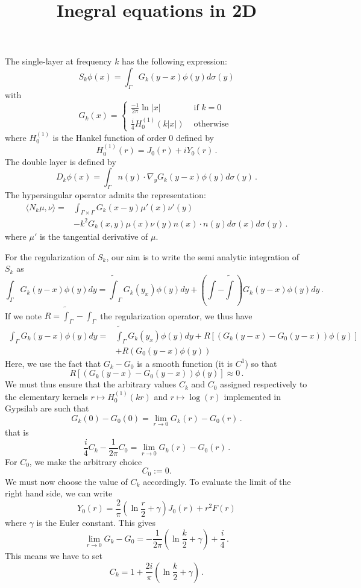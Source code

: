 \documentclass[utf8]{article}
\title{Inegral equations in 2D}
\begin{document}
\maketitle
The single-layer at frequency $k$ has the following expression:
\[S_k \phi(x) = \int_{\Gamma} G_k(y-x) \phi(y)d\sigma(y)\]
with	
\[G_k(x) = \begin{cases}
\frac{-1}{2\pi} \ln | x | & \text{ if } k = 0\\
\frac{i}{4}H_0^{(1)}(k |x|) & \text{ otherwise }
\end{cases}\]
where $H_0^{(1)}$ is the Hankel function of order $0$ defined by 
\[H_0^{(1)}(r) = J_0(r) + i Y_0(r) \,.\]
The double layer is defined by 
\[D_k \phi(x) = \int_{\Gamma} n(y) \cdot \nabla_y G_k(y-x) \phi(y) d\sigma(y)\,.\]
The hypersingular operator admits the representation:
\begin{equation}
\begin{split}
\langle{N_k \mu},{\nu}\rangle = &\int_{\Gamma\times \Gamma} G_k(x-y) \mu'(x) \nu'(y)\\
&- k^2 G_k(x,y) \mu(x) \nu(y) n(x) \cdot n(y) d\sigma(x) d\sigma(y)\,.
\end{split}
\label{NkenfonctiondeSk}
\end{equation}
where $\mu'$ is the tangential derivative of $\mu$.

For the regularization of $S_k$, our aim is to write the semi analytic integration of $S_k$ as
\[\int_{\Gamma} G_k(y-x) \phi(y)dy = \tilde{\int}_\Gamma G_k(y_x) \phi(y) dy + \left( \int - \tilde{\int} \right) G_k(y-x) \phi(y)dy\,.\]
If we note $R = \tilde{\int}_\Gamma - \int_\Gamma$ the regularization operator, we thus have 
\[\begin{split}
\int_{\Gamma} G_k(y-x) \phi(y)dy =& \tilde{\int}_\Gamma G_k(y_x) \phi(y) dy + R\left[\left(G_k(y-x) - G_0(y-x) \right)\phi(y)\right] \\
& + R \left( G_0(y-x) \phi(y)\right)
\end{split}\]
Here, we use the fact that $G_k  - G_0$ is a smooth function (it is $C^1$) so that  \[R\left[\left(G_k(y-x) - G_0(y-x) \right)\phi(y)\right] \approx 0\,.\]
We must thus ensure that the arbitrary values $C_k$ and $C_0$ assigned respectively to the elementary kernels $r \mapsto H_0^{(1)}(kr)$ and $r \mapsto \log(r)$ implemented in Gypsilab are such that 
\[G_k(0) - G_0(0) = \lim_{r \to 0} G_k(r) - G_0(r)\,.\]
that is
\begin{equation}
\label{valeurDeCk}
	\frac{i}{4}C_k - \frac{1}{2\pi} C_0 = \lim_{r \to 0} G_k(r) - G_0(r)\,.
\end{equation}
For $C_0$, we make the arbitrary choice 
\[C_0 := 0.\]
We must now choose the value of $C_k$ accordingly. To evaluate the limit of the right hand side, we can write \cite[Eq. 10.8.2]{NIST:DLMF}
\[Y_0(r) = \frac{2}{\pi} \left( \ln \frac{r}{2} + \gamma \right)J_0(r) + r^2 F(r)\]
where $\gamma$ is the Euler constant. This gives
\[\lim_{r \to 0} G_k - G_0 = -\frac{1}{2\pi} \left(\ln \frac{k}{2} + \gamma\right) + \frac{i}{4}\,.\]
This means we have to set 
\[C_k = 1 + \frac{2i}{\pi} \left(\ln\frac{k}{2} + \gamma\right)\,.\]



\end{document}
